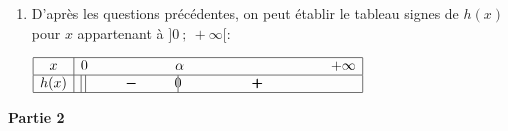 \begin{enumerate}
\begin{center}
{\renewcommand{\arraystretch}{1.5}
\def\esp{\hspace*{2.5cm}}
\def\hauteur{20pt}
$\begin{array}{|c|l*4{c}|}
\hline
x & 0  & \esp & \e^{\frac{1}{2}} & \esp & +\infty \\ 
\hline
h'(x) &  \vline\;\vline  &   \pmb{+} & \vline\hspace{-2.7pt}0 & \pmb{-} & \\ 
\hline
 & \vline\;\vline &  &   \Rnode{max}{1+\dfrac{1}{2\e}}  &  &  \rule{0pt}{\hauteur} \\  
h(x) &  \vline\;\vline &     &  &  &  \rule{0pt}{\hauteur} \\ 
 & \vline\;\vline \Rnode{min1}{-\infty} &   &  &  &   \Rnode{min2}{1} \rule{0pt}{\hauteur}    
 \ncline{->}{min1}{max} 
 \ncline{->}{max}{min2} 
 \\ 
\hline
\end{array} $
}
\end{center}	

D'après ce tableau de variations, l'équation $h(x)=0$ admet une solution unique  dans l'intervalle $\left  ] 0~;~\e^{\frac{1}{2}}\right [$.

On appelle $\alpha$ cette solution; $h\left (\dfrac{1}{2}\right ) \approx -1,8<0$ et $h(1)=1>0$ donc $\dfrac{1}{2} < \alpha < 1$.

\item D'après les questions précédentes, on peut établir le tableau  signes de $h(x)$ pour $x$ appartenant à $]0~;~ +\infty[$:

\begin{center}
{\renewcommand{\arraystretch}{1.5}
\def\esp{\hspace*{1.5cm}}
\def\hauteur{20pt}
$\begin{array}{|c|l*4{c}|}
\hline
x & 0  & \esp & \alpha & \esp \esp & +\infty \\ 
\hline
h(x) &  \vline\;\vline  &   \pmb{-} & \vline\hspace{-2.7pt}0 & \pmb{+} & \\ 
\hline
\end{array} $
}
\end{center}	

\end{enumerate}

\bigskip

\begin{center}\textbf{Partie 2}\end{center}


